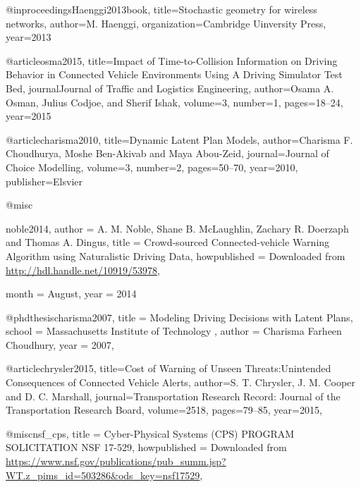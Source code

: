 {{{{{{@inproceedings{Haenggi2013book,
	title={Stochastic geometry for wireless networks},
	author={M. Haenggi},
	organization={Cambridge Uinversity Press},
	year={2013}
}








@article{osma2015,
	title={Impact of Time-to-Collision Information on Driving Behavior in Connected Vehicle Environments Using A Driving Simulator Test Bed},
	journal{Journal of Traffic and Logistics Engineering},
	author={Osama A. Osman, Julius Codjoe, and Sherif Ishak},
	volume={3},
	number={1},
	 pages={18--24},
	year={2015}
}


@article{charisma2010,
	title={Dynamic Latent Plan Models},
	author={Charisma F. Choudhurya, Moshe Ben-Akivab and Maya Abou-Zeid},
	journal={Journal of Choice Modelling},
	volume={3},
	number={2},
	pages={50--70},
	year={2010},
	publisher={Elsvier}
}


@misc{noble2014,
	author = {A. M. Noble, Shane B. McLaughlin, Zachary R. Doerzaph and Thomas A. Dingus},
	title = {Crowd-sourced Connected-vehicle Warning Algorithm using Naturalistic Driving Data},
	howpublished = {Downloaded from \url{http://hdl.handle.net/10919/53978}},

	month = August,
	year = 2014
}


@phdthesis{charisma2007,
	title    = {Modeling Driving Decisions with Latent Plans},
	school   = {Massachusetts Institute of Technology },
	author   = {Charisma Farheen Choudhury},
	year     = {2007}, %
}


@article{chrysler2015,
	title={Cost of Warning of Unseen Threats:Unintended Consequences of Connected Vehicle Alerts},
	author={S. T. Chrysler, J. M. Cooper and D. C. Marshall},
	journal={Transportation Research Record: Journal of the Transportation Research Board},
	volume={2518},
	pages={79--85},
	year={2015},
}

@misc{nsf_cps,
        title = {Cyber-Physical Systems (CPS) PROGRAM SOLICITATION NSF 17-529},
        howpublished = {Downloaded from \url{https://www.nsf.gov/publications/pub_summ.jsp?WT.z_pims_id=503286&ods_key=nsf17529}},
}



}}}}}}
